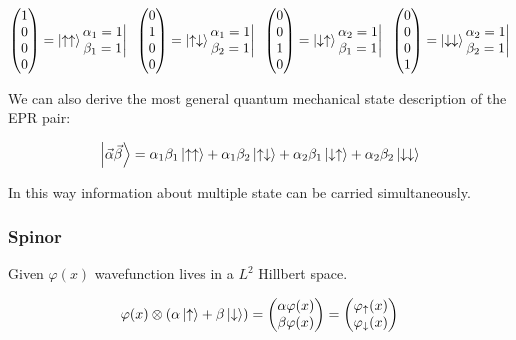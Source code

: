 		$$\begin{pmatrix}1\\0\\0\\0\end{pmatrix}=\ket{\uparrow\uparrow}\begin{matrix}\alpha_1=1\\\beta_1=1\end{matrix}\bigg| \;\;\begin{pmatrix}0\\1\\0\\0\end{pmatrix}=\ket{\uparrow\downarrow}\begin{matrix}\alpha_1=1\\\beta_2=1\end{matrix}\bigg| \;\;\begin{pmatrix}0\\0\\1\\0\end{pmatrix}=\ket{\downarrow\uparrow}\begin{matrix}\alpha_2=1\\\beta_1=1\end{matrix}\bigg| \;\;\begin{pmatrix}0\\0\\0\\1\end{pmatrix}=\ket{\downarrow\downarrow}\begin{matrix}\alpha_2=1\\\beta_2=1\end{matrix}\bigg|$$

		We can also derive the most general quantum mechanical state description of the EPR pair:

		$$\ket{\vec{\alpha}\vec{\beta}}=\alpha_1\beta_1\ket{\uparrow\uparrow}+\alpha_1\beta_2\ket{\uparrow\downarrow}+\alpha_2\beta_1\ket{\downarrow\uparrow}+\alpha_2\beta_2\ket{\downarrow\downarrow}$$

		In this way information about multiple state can be carried simultaneously.

		\subsubsection{Spinor}
		Given $\varphi(x)$ wavefunction lives in a \emph{$L^2$} Hillbert space.

		$$\varphi(x)\otimes(\alpha\ket{\uparrow}+\beta\ket{\downarrow})=\begin{pmatrix}\alpha\varphi(x)\\\beta\varphi(x)\end{pmatrix}=\begin{pmatrix}\varphi_{\uparrow}(x)\\\varphi_{\downarrow}(x)\end{pmatrix}$$

